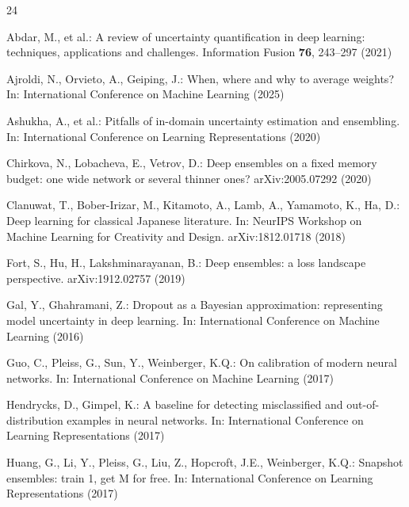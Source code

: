 \documentclass[11pt,a4paper]{article}
\begin{document}
\begin{thebibliography}{24}
\small
\setlength{\itemsep}{1pt}

 Abdar, M., et al.: A review of
uncertainty quantification in deep learning: techniques, applications and
challenges. Information Fusion \textbf{76}, 243--297 (2021)

 Ajroldi, N., Orvieto, A.,
Geiping, J.: When, where and why to average weights? In: International
Conference on Machine Learning (2025)

 Ashukha, A., et al.: Pitfalls
of in-domain uncertainty estimation and ensembling. In: International
Conference on Learning Representations (2020)

 Chirkova, N., Lobacheva,
E., Vetrov, D.: Deep ensembles on a fixed memory budget: one wide network
or several thinner ones? arXiv:2005.07292 (2020)

 Clanuwat, T., Bober-Irizar,
M., Kitamoto, A., Lamb, A., Yamamoto, K., Ha, D.: Deep learning for
classical Japanese literature. In: NeurIPS Workshop on Machine Learning for
Creativity and Design. arXiv:1812.01718 (2018)

 Fort, S., Hu, H., Lakshminarayanan,
B.: Deep ensembles: a loss landscape perspective. arXiv:1912.02757 (2019)

 Gal, Y., Ghahramani, Z.:
Dropout as a Bayesian approximation: representing model uncertainty in deep
learning. In: International Conference on Machine Learning (2016)

 Guo, C., Pleiss, G., Sun, Y.,
Weinberger, K.Q.: On calibration of modern neural networks. In:
International Conference on Machine Learning (2017)

 Hendrycks, D., Gimpel,
K.: A baseline for detecting misclassified and out-of-distribution
examples in neural networks. In: International Conference on Learning
Representations (2017)

 Huang, G., Li, Y., Pleiss, G.,
Liu, Z., Hopcroft, J.E., Weinberger, K.Q.: Snapshot ensembles: train 1,
get M for free. In: International Conference on Learning Representations
(2017)


\end{thebibliography}
\end{document}
